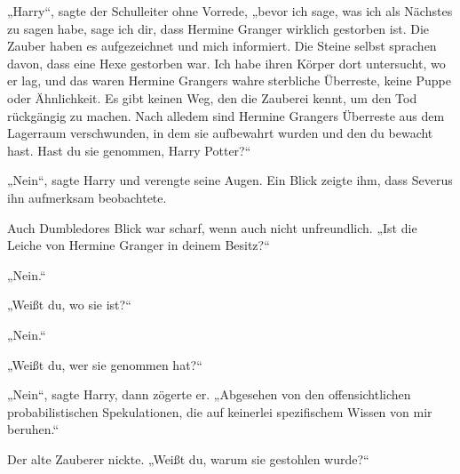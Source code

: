 „Harry“, sagte der Schulleiter ohne Vorrede, „bevor ich sage, was ich als Nächstes zu sagen habe, sage ich dir, dass Hermine Granger wirklich gestorben ist. Die Zauber haben es aufgezeichnet und mich informiert. Die Steine selbst sprachen davon, dass eine Hexe gestorben war. Ich habe ihren Körper dort untersucht, wo er lag, und das waren Hermine Grangers wahre sterbliche Überreste, keine Puppe oder Ähnlichkeit. Es gibt keinen Weg, den die Zauberei kennt, um den Tod rückgängig zu machen. Nach alledem sind Hermine Grangers Überreste aus dem Lagerraum verschwunden, in dem sie aufbewahrt wurden und den du bewacht hast. Hast du sie genommen, Harry Potter?“

„Nein“, sagte Harry und verengte seine Augen. Ein Blick zeigte ihm, dass Severus ihn aufmerksam beobachtete.

Auch Dumbledores Blick war scharf, wenn auch nicht unfreundlich.
„Ist die Leiche von Hermine Granger in deinem Besitz?“

„Nein.“

„Weißt du, wo sie ist?“

„Nein.“

„Weißt du, wer sie genommen hat?“

„Nein“, sagte Harry, dann zögerte er.
„Abgesehen von den offensichtlichen probabilistischen Spekulationen, die auf keinerlei spezifischem Wissen von mir beruhen.“

Der alte Zauberer nickte.
„Weißt du, warum sie gestohlen wurde?“

